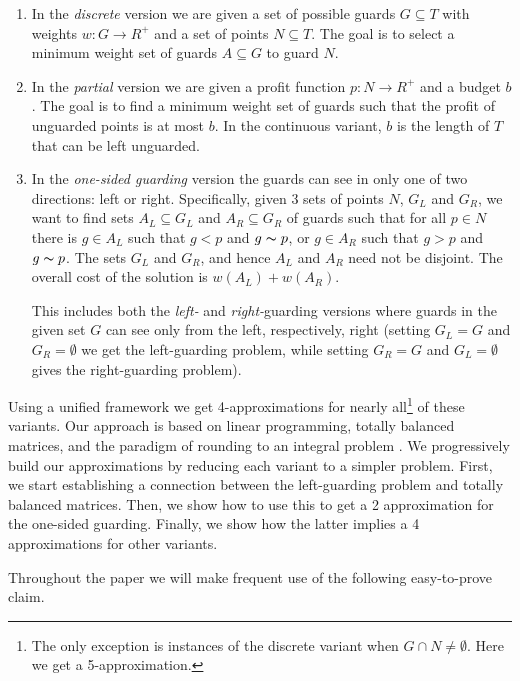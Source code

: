 \documentclass[11pt]{article}
\newcommand{\sees}{\thicksim}
\begin{document}
\begin{enumerate}
  \item In the \emph{discrete} version we are given a set of possible
  guards $G \subseteq T$ with weights $w: G \rightarrow R^+$ and a set of
  points $N \subseteq T$. The goal is to select a minimum weight set of
  guards $A \subseteq G$ to guard $N$.

  \item In the \emph{partial} version we are given a profit function $p: N
  \rightarrow R^+$ and a budget $b$. The goal is to find a minimum weight set of
  guards such that the profit of unguarded points is at most $b$. In the
  continuous variant, $b$ is the length of $T$ that can be left unguarded.

  \item In the \emph{one-sided guarding} version the guards can see in only one
  of two directions: left or right. Specifically, given $3$ sets of points $N$, $G_L$ and $G_R$,
  we want to find sets $A_L\subseteq G_L$ and $A_R\subseteq G_R$ of guards
  such that for all $p \in N$ there is $g \in A_L$ such that $g < p$ and $g
  \sees p$, or $g \in A_R$ such that $g > p$ and $g \sees p$. The sets $G_L$
  and $G_R$, and hence $A_L$ and $A_R$ need not be disjoint. The overall cost of the solution
  is $w(A_L) + w(A_R)$.

  This includes both the \emph{left-} and {\em right-}guarding versions
  where guards in the given set $G$ can see only from the left, respectively, right
  (setting $G_L=G$ and $G_R=\emptyset$ we get the left-guarding problem, while
  setting $G_R=G$ and $G_L=\emptyset$ gives the right-guarding problem).
\end{enumerate}

Using a unified framework we get 4-approximations for nearly all\footnote{The
  only exception is instances of the discrete variant when $G \cap N \neq
  \emptyset$. Here we get a 5-approximation.} of these variants.  Our approach
is based on linear programming, totally balanced matrices, and the paradigm of
rounding to an integral problem
\cite{journals/jal/GaurIK02,journals/orl/HassinS08}. We progressively build
our approximations by reducing each variant to a simpler problem. First, we
start establishing a connection between the left-guarding problem and totally
balanced matrices. Then, we show how to use this to get a 2 approximation for
the one-sided guarding. Finally, we show how the latter implies a 4
approximations for other variants.

Throughout the paper we will make frequent use of the following easy-to-prove
claim.
\end{document}
